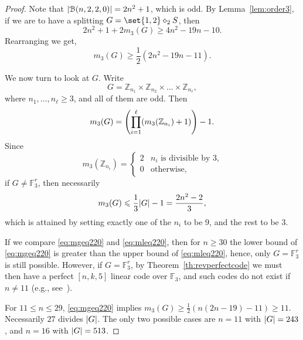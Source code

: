 \documentclass[sort&compress]{elsarticle}
\DeclarePairedDelimiter\abs{\lvert}{\rvert}
\DeclarePairedDelimiter\parenv{\lparen}{\rparen}
\newcommand{\cB}{\mathcal{B}}
\renewcommand{\leq}{\leqslant}
\renewcommand{\geq}{\geqslant}
\newcommand{\F}{\mathbb{F}}
\newcommand{\Z}{\mathbb{Z}}
\newcommand{\splt}{\diamond}
\begin{document}
    \begin{proof}
      Note that $\abs{\cB(n,2,2,0)}=2n^2+1$, which is odd.  By
      Lemma~\ref{lem:order3}, if we are to have a splitting
      $G=\set{1,2}\splt_2 S$, then
      \[ 2n^2+1 +2m_3(G) \geq 4n^2 - 19n-10.\]
      Rearranging we get,
      \begin{equation}
        \label{eq:mgeq220}
        m_3(G)\geq \frac{1}{2}(2n^2-19n-11).
      \end{equation}

      We now turn to look at $G$.  Write
      \[ G = \Z_{n_1}\times \Z_{n_2} \times \dots \times \Z_{n_\ell},\]
      where $n_1,\dots,n_\ell\geq 3$, and all of them are odd.  Then
      \[ m_3(G) = \parenv*{\prod_{i=1}^{\ell} (m_3(\Z_{n_i})+1)}-1.\]
      Since 
      \[ m_3(\Z_{n_i})=\begin{cases}
      2 & \text{$n_i$ is divisible by $3$,} \\
      0 & \text{otherwise,}
      \end{cases}\]
      if $G\neq \F_3^r$, then necessarily
      \begin{equation}
        \label{eq:mleq220}
        m_3(G)\leq \frac{1}{3}\abs{G}-1= \frac{2n^2-2}{3},
      \end{equation}
      which is attained by setting exactly one of the $n_i$ to be $9$,
      and the rest to be $3$.
  
      If we compare \eqref{eq:mgeq220} and \eqref{eq:mleq220}, then
      for $n\geq 30$ the lower bound of \eqref{eq:mgeq220} is greater
      than the upper bound of \eqref{eq:mleq220}, hence, only
      $G=\F_3^r$ is still possible. However, if $G=\F_3^r$, by
      Theorem~\ref{th:revperfectcode} we must then have a perfect
      $[n,k,5]$ linear code over $\F_3$, and such codes do not exist
      if $n\neq 11$ (e.g., see~\cite{MacSlo78}).
  
      For $11\leq n \leq 29$, \eqref{eq:mgeq220} implies $m_3(G) \geq
      \frac{1}{2}(n(2n-19)-11)\geq 11.$ Necessarily $27$
      divides $\abs{G}$. The only two possible cases are $n=11$ with
      $\abs{G}=243$, and $n=16$ with $\abs{G}=513$.
  

\end{proof}
\end{document}
